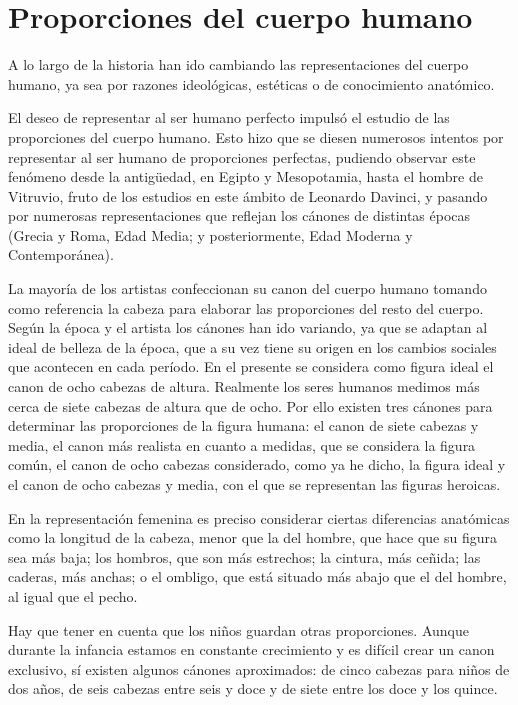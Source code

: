 \section{Proporciones del cuerpo humano} %
A lo largo de la historia han ido cambiando las representaciones del cuerpo humano, ya sea por razones ideológicas, estéticas o de conocimiento anatómico.

El deseo de representar al ser humano perfecto impulsó el estudio de las proporciones del cuerpo humano. Esto hizo que se diesen numerosos intentos por representar al ser humano de proporciones perfectas, pudiendo observar este fenómeno desde la antigüedad, en Egipto y Mesopotamia, hasta el hombre de Vitruvio, fruto de los estudios en este ámbito de Leonardo Davinci, y pasando por numerosas representaciones que reflejan los cánones de distintas épocas (Grecia y Roma, Edad Media; y posteriormente, Edad Moderna y Contemporánea).


La mayoría de los artistas confeccionan su canon del cuerpo humano tomando como referencia la cabeza para elaborar las proporciones del resto del cuerpo.
Según la época y el artista los cánones han ido variando, ya que se adaptan al ideal de belleza de la época, que a su vez tiene su origen en los cambios sociales que acontecen en cada período. En el presente se considera como figura ideal el canon de ocho cabezas de altura. Realmente los seres humanos medimos más cerca de siete cabezas de altura que de ocho. Por ello existen tres cánones para determinar las proporciones de la figura humana: el canon de siete cabezas y media, el canon más realista en cuanto a medidas, que se considera la figura común, el canon de ocho cabezas considerado, como ya he dicho, la figura ideal y el canon de ocho cabezas y media, con el que se representan las figuras heroicas.

En la representación femenina es preciso considerar ciertas diferencias anatómicas como la longitud de la cabeza, menor que la del hombre, que hace que su figura sea más baja; los hombros, que son más estrechos; la cintura, más ceñida; las caderas, más anchas; o el ombligo, que está situado más abajo que el del hombre, al igual que el pecho.

Hay que tener en cuenta que los niños guardan otras proporciones. Aunque durante la infancia estamos en constante crecimiento y es difícil crear un canon exclusivo, sí existen algunos cánones aproximados: de cinco cabezas para niños de dos años, de seis cabezas entre seis y doce y de siete entre los doce y los quince.

